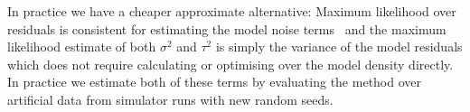 \documentclass{article}
\newcommand\numberthis{\addtocounter{equation}{1}\tag{\theequation}}
\newcommand{\danm}[1]{\todo[inline,color=green!20!white]{\textbf{DanM:} #1}}
\newcommand{\vv}[1]{\boldsymbol{#1}}
\newcommand{\mm}[1]{\mathrm{#1}}
\newcommand{\rv}[1]{\mathsf{#1}}
\newcommand{\vrv}[1]{\vv{\rv{#1}}}
\newcommand{\dist}[1]{\mathcal{#1}}
\newcommand{\disteq}{\stackrel{\mathrm{d}}{=}}
\newcommand{\gvn}{\mid}
\newcommand{\state}{\rv{x}}
\newcommand{\statest}{x}
\begin{document}
In practice we have a cheaper approximate alternative:
Maximum likelihood over residuals is consistent for estimating the model noise terms~\citep{MitchellAdaptive2000} and the maximum likelihood estimate of both \(\sigma^2\) and \(\tau^2\) is simply the variance of the model residuals which does not require calculating or optimising over the model density directly.
In practice we estimate both of these terms by evaluating the method over artificial data from simulator runs with new random seeds.
\fi




\end{document}
